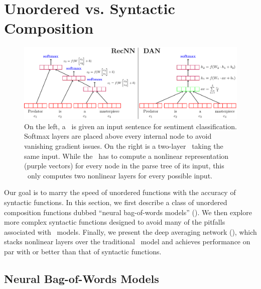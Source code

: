 
\section{Unordered vs. Syntactic Composition}
\label{sec:model}

\begin{figure}[t]
  \includegraphics[scale=0.8]{2015_acl_dan/figures/dan_recnn_actualfinal.pdf}
  \caption{On the left, a \recnn\ is given an input sentence for sentiment
          classification. Softmax layers are placed above every internal node to
          avoid vanishing gradient issues. On the right is a two-layer
          \dan\ taking the same input. While the \recnn\ has to compute a
          nonlinear representation (purple vectors) for every node in the parse tree of its
          input, this \dan\ only computes two nonlinear layers for every
          possible input. }
  \label{fig:dan}
\end{figure}


























Our goal is to marry the speed of unordered functions with the accuracy of
syntactic functions. In this section, we first describe a
class of unordered composition functions dubbed ``neural bag-of-words models''
(\nbow). We then explore more complex syntactic functions designed to avoid many
of the pitfalls associated with \nbow\ models. Finally, we present the deep
averaging network (\dan), which stacks nonlinear layers over the
traditional \nbow\ model and achieves performance on par with or better than
that of syntactic functions.

\subsection{Neural Bag-of-Words Models}\label{sec:nbow}

